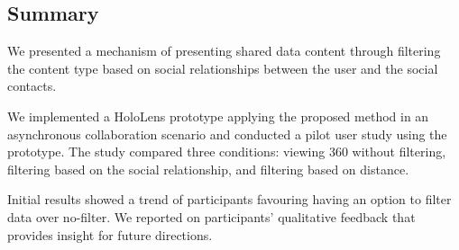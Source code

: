 \subsection{Summary}

We presented a mechanism of presenting shared data content through filtering the content type based on social relationships between the user and the social contacts. 

We implemented a HoloLens prototype applying the proposed method in an asynchronous collaboration scenario and conducted a pilot user study using the prototype. The study compared three conditions: viewing 360 without filtering, filtering based on the social relationship, and filtering based on distance. 

Initial results showed a trend of participants favouring having an option to filter data over no-filter. We reported on participants' qualitative feedback that provides insight for future directions. 
